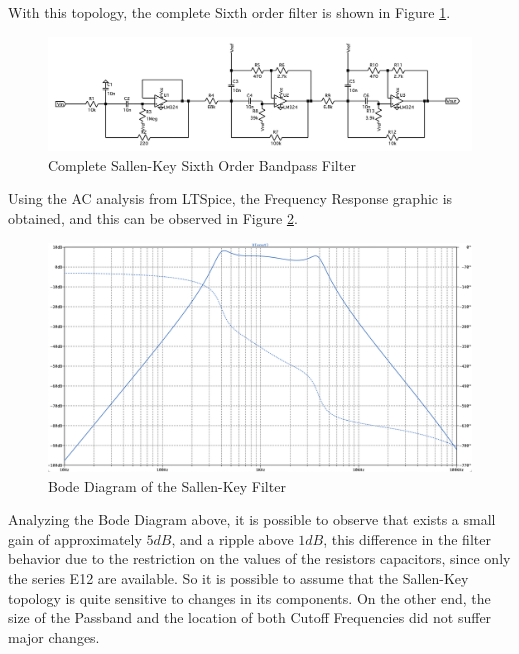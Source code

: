 With this topology, the complete Sixth order filter is shown in Figure \ref{fig:SKFilter}. 

\begin{figure}[H]
    \centering
    \includegraphics*[scale = 0.4]{Images/SKFilter.png}
    \caption{Complete Sallen-Key Sixth Order Bandpass Filter}
    \label{fig:SKFilter}
\end{figure}

Using the AC analysis from LTSpice, the Frequency Response graphic is obtained, and this can be observed in Figure \ref{fig:SimSKFilter}.

\begin{figure}[H]
    \centering
    \includegraphics*[scale = 0.25]{Images/SimSKFilter.png}
    \caption{Bode Diagram of the Sallen-Key Filter}
    \label{fig:SimSKFilter}
\end{figure}

Analyzing the Bode Diagram above, it is possible to observe that exists a small gain of approximately $5dB$, and a ripple above $1dB$, this difference in the filter behavior due to the restriction on the values of the resistors capacitors, since only the series E12 are available. So it is possible to assume that the Sallen-Key topology is quite sensitive to changes in its components. On the other end, the size of the Passband and the location of both Cutoff Frequencies did not suffer major changes. 

